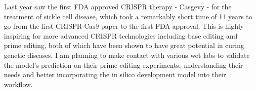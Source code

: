 \documentclass[a4,12pt]{article}
\begin{document}
Last year saw the first FDA approved CRISPR therapy - Casgevy - for the treatment of sickle cell disease, which took a remarkably short time of 11 years to go from the first CRISPR-Cas9 paper to the first FDA approval\cite{CRISPRClinicalTrials}. This is highly inspiring for more advanced CRISPR technologies including base editing and prime editing, both of which have been shown to have great potential in curing genetic diseases. I am planning to make contact with various wet labs to validate the model's prediction on their prime editing experiments, understanding their needs and better incorporating the in silico development model into their workflow. 

\printbibliography
\end{document}
